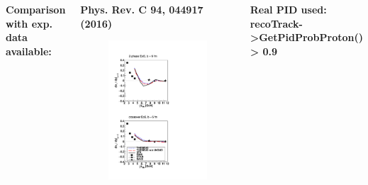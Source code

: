 \documentclass[dvipsnames] {beamer}
\begin{document}
\begin{frame}[shrink=20]
\begin{columns}[c]
    
      {\tiny \bf \centering Comparison with exp. data available:}
      \begin{block}{ \tiny \bf \centering Phys. Rev. C 94, 044917 (2016)}
      \begin{figure}[H]
        \includegraphics[width=.9\textwidth]{proton_THESEUS_111.pdf}
      \end{figure}  
    \end{block}
    \begin{block}{{\tiny \bf Real PID used:}}
      {\tiny \bf recoTrack->GetPidProbProton() > 0.9}
    \end{block}
  \end{columns} 
\end{frame}
\end{document}
